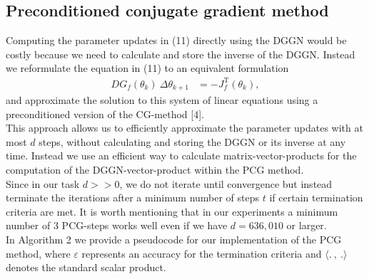 \documentclass[conference]{IEEEtran}
\begin{document}
	\subsection{Preconditioned conjugate gradient method}
	\noindent
	Computing the parameter updates in (11) directly using the DGGN would be costly because we need to calculate and store the inverse of the DGGN. Instead we reformulate the equation in (11) to an equivalent formulation
	\begin{align}
	DG_{f}(\theta_{k})\: \Delta\theta_{k+1} &= -J_{f}^{\mathrm{T}}(\theta_{k}),
	\end{align}
	and approximate the solution to this system of linear equations using a preconditioned version of the CG-method [4]. \\
	This approach allows us to efficiently approximate the parameter updates with at most $d$ steps, without calculating and storing the DGGN or its inverse at any time. Instead we use an efficient way to calculate matrix-vector-products for the computation of the DGGN-vector-product within the PCG method.\\
	Since in our task $d>>0$, we do not iterate until convergence but instead terminate the iterations after a minimum number of steps $t$ if certain termination criteria are met. It is worth mentioning that in our experiments a minimum number of 3 PCG-steps works well even if we have $d=636,010$ or larger. \\
	In Algorithm 2 we provide a pseudocode for our implementation of the PCG method, where $\varepsilon$ represents an accuracy for the termination criteria and $\langle .\:,\: .\rangle$ denotes the standard scalar product.
	
\end{document}
